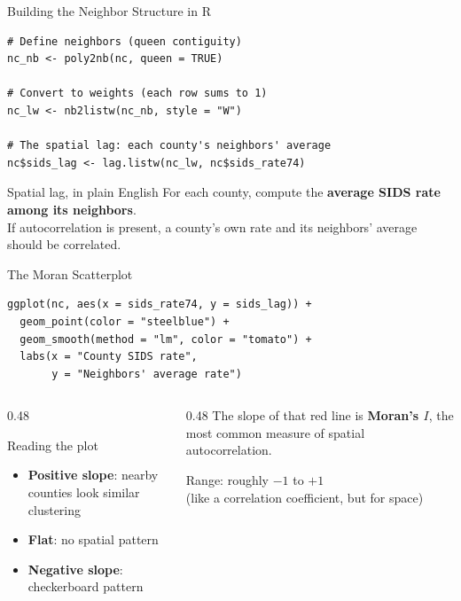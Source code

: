 \documentclass[aspectratio=169, 12pt]{beamer}
\begin{document}
\begin{frame}[fragile]{Building the Neighbor Structure in R}
\begin{lstlisting}
# Define neighbors (queen contiguity)
nc_nb <- poly2nb(nc, queen = TRUE)

# Convert to weights (each row sums to 1)
nc_lw <- nb2listw(nc_nb, style = "W")

# The spatial lag: each county's neighbors' average
nc$sids_lag <- lag.listw(nc_lw, nc$sids_rate74)
\end{lstlisting}
  \vspace{0.5em}
  \begin{block}{Spatial lag, in plain English}
    For each county, compute the \textbf{average SIDS rate among its neighbors}.\\[4pt]
    If autocorrelation is present, a county's own rate and its neighbors' average should be correlated.
  \end{block}
\end{frame}


\begin{frame}[fragile]{The Moran Scatterplot}
\begin{lstlisting}
ggplot(nc, aes(x = sids_rate74, y = sids_lag)) +
  geom_point(color = "steelblue") +
  geom_smooth(method = "lm", color = "tomato") +
  labs(x = "County SIDS rate",
       y = "Neighbors' average rate")
\end{lstlisting}
  \begin{columns}[t]
    \begin{column}{0.48\textwidth}
      \begin{block}{Reading the plot}
        \begin{itemize}
          \item \textbf{Positive slope}: nearby counties look similar \textrightarrow{} clustering
          \item \textbf{Flat}: no spatial pattern
          \item \textbf{Negative slope}: checkerboard pattern
        \end{itemize}
      \end{block}
    \end{column}
    \begin{column}{0.48\textwidth}
      \small The slope of that red line is \textbf{Moran's $I$}, the most common measure of spatial autocorrelation.
      \vspace{0.4em}

      Range: roughly $-1$ to $+1$\\
      (like a correlation coefficient, but for space)
    \end{column}
  \end{columns}
\end{frame}
\end{document}
